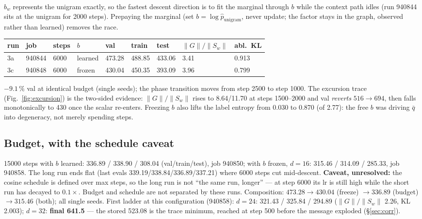 \documentclass[10pt,a4paper]{article}
\newcommand{\msgu}{\ensuremath{\lVert G\rVert/\lVert S_w\rVert}}
\newcommand{\qbar}{\ensuremath{\bar q}}
\begin{document}
$b_w$ represents the unigram exactly, so the fastest descent direction is to fit the
marginal through $b$ while the context path idles (run 940844 sits at the unigram for 2000
steps). Prepaying the marginal (set $b = \log \hat p_{\mathrm{unigram}}$, never update; the
factor stays in the graph, observed rather than learned) removes the race.

\begin{table}[h]\centering\small
\begin{tabular}{lllllllll}
\toprule
run & job & steps & $b$ & val & train & test & \msgu{} & abl.\ KL\\
\midrule
3a & 940844 & 6000 & learned & 473.28 & 488.85 & 433.06 & 3.41 & 0.913\\
3c & 940848 & 6000 & frozen & 430.04 & 450.35 & 393.09 & 3.96 & 0.799\\
\bottomrule
\end{tabular}
\end{table}

$-9.1\,\%$ val at identical budget (single seeds); the phase transition moves from step 2500
to step 1000. The excursion trace (Fig.~\ref{fig:excursion}) is the two-sided evidence:
\msgu{} rises to 8.64/11.70 at steps 1500--2000 and val \emph{reverts} $516 \to 694$, then
falls monotonically to 430 once the scalar re-enters. Freezing $b$ also lifts the label
entropy from 0.030 to 0.870 (of 2.77): the free $b$ was driving \qbar{} into degeneracy, not
merely spending steps.

\subsection{Budget, with the schedule caveat}

15000 steps with $b$ learned: 336.89 / 338.90 / 308.04 (val/train/test), job 940850; with
$b$ frozen, $d{=}16$: 315.46 / 314.09 / 285.33, job 940858. The long run ends flat (last
evals 339.19/338.84/336.89/337.21) where 6000 steps cut mid-descent. \textbf{Caveat,
unresolved:} the cosine schedule is defined over max steps, so the long run is not ``the
same run, longer'' --- at step 6000 its lr is still high while the short run has decayed to
$0.1\times$. Budget and schedule are not separated by these runs. Composition:
$473.28 \to 430.04$ (freeze) $\to 336.89$ (budget) $\to 315.46$ (both); all single seeds.
First ladder at this configuration (940858): $d{=}24$: 321.43 / 325.84 / 294.89 (\msgu{}
2.26, KL 2.003); $d{=}32$: \textbf{final 641.5} --- the stored 523.08 is the trace minimum,
reached at step 500 before the message exploded (\S\ref{sec:corr}).
\end{document}
